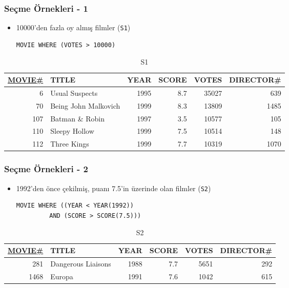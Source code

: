 \documentclass[dvipsnames]{beamer}
\theoremstyle{plain}
\begin{document}
\begin{frame}[fragile]
  \frametitle{Seçme Örnekleri - 1}

    \begin{itemize}
      \item 10000'den fazla oy almış filmler (\texttt{S1})

      \begin{lstlisting}
MOVIE WHERE (VOTES > 10000)
      \end{lstlisting}
    \end{itemize}

    \vspace{-10pt}
    \begin{tiny}
    \begin{table}
      \caption{S1}
      \begin{tabular}{|r|l|r|r|r|r|}\hline
\underline{MOVIE\#} & TITLE & YEAR & SCORE & VOTES & DIRECTOR\#\\[2pt]\hline\hline
  6 & Usual Suspects        & 1995 &   8.7 & 35027 &        639\\\hline
 70 & Being John Malkovich  & 1999 &   8.3 & 13809 &       1485\\\hline
107 & Batman \& Robin       & 1997 &   3.5 & 10577 &        105\\\hline
110 & Sleepy Hollow         & 1999 &   7.5 & 10514 &        148\\\hline
112 & Three Kings           & 1999 &   7.7 & 10319 &       1070\\\hline
      \end{tabular}
    \end{table}
    \end{tiny}
\end{frame}

\begin{frame}[fragile]
  \frametitle{Seçme Örnekleri - 2}

    \begin{itemize}
      \item 1992'den önce çekilmiş, puanı 7.5'in üzerinde olan filmler
        (\texttt{S2})   

      \begin{lstlisting}
MOVIE WHERE ((YEAR < YEAR(1992))
         AND (SCORE > SCORE(7.5)))
      \end{lstlisting}
    \end{itemize}

    \vspace{-10pt}
    \begin{tiny}
    \begin{table}
      \caption{S2}
      \begin{tabular}{|r|l|r|r|r|r|}\hline
\underline{MOVIE\#} & TITLE & YEAR & SCORE & VOTES & DIRECTOR\#\\[2pt]\hline\hline
   281 & Dangerous Liaisons & 1988 &   7.7 &  5651 &        292\\\hline
  1468 & Europa             & 1991 &   7.6 &  1042 &        615\\\hline
      \end{tabular}
    \end{table}
    \end{tiny}
\end{frame}
\end{document}
